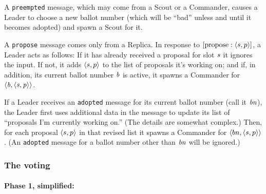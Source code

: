 \documentclass[final]{article}
\newcommand{\listinline}[1]{\text{\lstinline{#1}}}
\newcommand{\bsp}{\mbox{$\NUPRLpair{\NUPRL{b}}{\NUPRLpair{\NUPRL{s}}{\NUPRL{p}}}$}}
\newcommand{\MSG}[2]{[\listinline{#1}:#2]}
\begin{document}
A \lstinline{preempted} message, which may come from a Scout or a
Commander, causes a Leader to choose a new ballot number (which will
be ``bad'' unless and until it becomes adopted) and spawn a Scout for
it.

A \lstinline{propose} message comes only from a Replica.  In response
to $\MSG{propose}{\NUPRLpair{s}{p}}$, a Leader acts as follows:
If it has already received a proposal for slot $\mathit{s}$ it ignores
the input.  If not, it adds $\langle s,p\rangle$ to the list of
proposals it's working on; and if, in addition, its current ballot
number $\mathit{b}$ is active, it spawns a Commander for \bsp.

If a Leader receives an \lstinline{adopted} message for its current
ballot number (call it $\mathit{bn}$), the Leader first uses additional
data in the message to update its list of ``proposals I'm currently
working on.''  (The details are somewhat complex.)  Then, for each
proposal $\langle s,p\rangle$ in that revised list it spawns a Commander
for $\langle bn,\langle s,p\rangle\rangle$.  (An \lstinline{adopted}
message for a ballot number other than $\mathit{bn}$ will be ignored.)

\subsubsection{The voting}\label{sec:paxos-voting}

\paragraph{Phase 1, simplified:}
\end{document}
